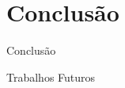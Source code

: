 \section{Conclusão}
\begin{frame}{Conclusão}

\end{frame}

\begin{frame}{Trabalhos Futuros}

\end{frame}